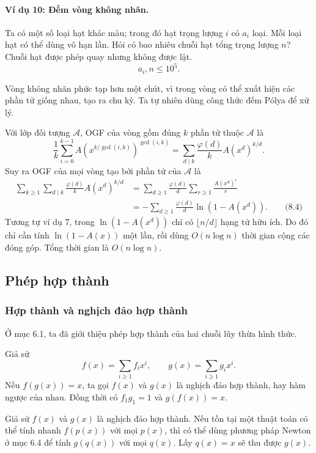 \documentclass[11pt]{article}
\begin{document}
\paragraph{Ví dụ 10: Đếm vòng không nhãn.}
Ta có một số loại hạt khác màu; trong đó hạt trọng lượng \(i\) có \(a_i\) loại.
Mỗi loại hạt có thể dùng vô hạn lần. Hỏi có bao nhiêu chuỗi hạt tổng trọng
lượng \(n\)? Chuỗi hạt được phép quay nhưng không được lật.
\[
  a_i,n\le 10^5.
\]

Vòng không nhãn phức tạp hơn một chút, vì trong vòng có thể xuất hiện các phần
tử giống nhau, tạo ra chu kỳ. Ta tự nhiên dùng công thức đếm Pólya để xử lý.

Với lớp đối tượng \(\mathcal A\), OGF của vòng gồm đúng \(k\) phần tử thuộc
\(\mathcal A\) là
\[
  \frac1k\sum_{i=0}^{k-1}A\!\left(x^{k/\gcd(i,k)}\right)^{\gcd(i,k)}
  =\sum_{d\mid k}\frac{\varphi(d)}k A(x^d)^{k/d}.
\]
Suy ra OGF của mọi vòng tạo bởi phần tử của \(\mathcal A\) là
\[
\begin{aligned}
  \sum_{k\ge 1}\sum_{d\mid k}\frac{\varphi(d)}kA(x^d)^{k/d}
  &= \sum_{d\ge 1}\frac{\varphi(d)}d\sum_{r\ge 1}\frac{A(x^d)^r}{r}\\
  &= -\sum_{d\ge 1}\frac{\varphi(d)}d\ln(1-A(x^d)). \qquad\text{(8.4)}
\end{aligned}
\]
Tương tự ví dụ 7, trong \(\ln(1-A(x^d))\) chỉ có \(\lfloor n/d\rfloor\) hạng
tử hữu ích. Do đó chỉ cần tính \(\ln(1-A(x))\) một lần, rồi dùng
\(O(n\log n)\) thời gian cộng các đóng góp. Tổng thời gian là \(O(n\log n)\).

\subsection{Phép hợp thành}

\subsubsection{Hợp thành và nghịch đảo hợp thành}

Ở mục 6.1, ta đã giới thiệu phép hợp thành của hai chuỗi lũy thừa hình thức.

Giả sử
\[
  f(x)=\sum_{i\ge 1} f_i x^i,\qquad
  g(x)=\sum_{i\ge 1} g_i x^i.
\]
Nếu \(f(g(x))=x\), ta gọi \(f(x)\) và \(g(x)\) là nghịch đảo hợp thành, hay hàm
ngược của nhau. Đồng thời có \(f_1g_1=1\) và \(g(f(x))=x\).

Giả sử \(f(x)\) và \(g(x)\) là nghịch đảo hợp thành. Nếu tồn tại một thuật toán
có thể tính nhanh \(f(p(x))\) với mọi \(p(x)\), thì có thể dùng phương pháp
Newton ở mục 6.4 để tính \(g(q(x))\) với mọi \(q(x)\). Lấy \(q(x)=x\) sẽ thu
được \(g(x)\).
\end{document}

